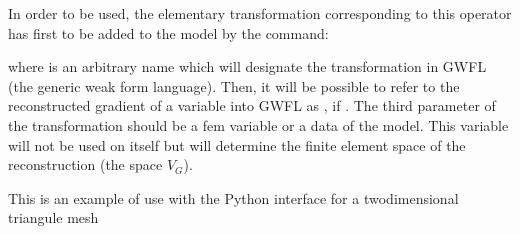 \documentclass[a4paper,11pt,english]{sphinxmanual}
\begin{document}
In order to be used, the elementary transformation corresponding to this operator has first to be added to the model by the command:

\begin{sphinxVerbatim}[commandchars=\\\{\}]
 
\end{sphinxVerbatim}

where  is an arbitrary name which will designate the transformation in GWFL (the generic weak form language). Then, it will be possible to refer to the reconstructed gradient of a variable  into GWFL as , if . The third parameter of the transformation  should be a fem variable or a data of the model. This variable will not be used on itself but will determine the finite element space of the reconstruction (the space \(V_G\)).

This is an example of use with the Python interface for a two\sphinxhyphen{}dimensional triangule mesh 
\end{document}
